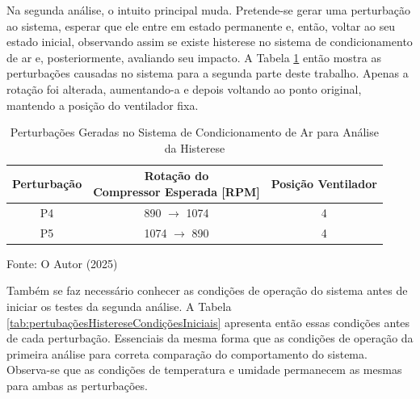 \newpage
Na segunda análise, o intuito principal muda. Pretende-se gerar uma perturbação ao sistema, esperar que ele entre em estado permanente e, então, voltar ao seu estado inicial, observando assim se existe histerese no sistema de condicionamento de ar e, posteriormente, avaliando seu impacto. A Tabela \ref{tab:pertubaçõesHisterese} então mostra as perturbações causadas no sistema para a segunda parte deste trabalho. Apenas a rotação foi alterada, aumentando-a e depois voltando ao ponto original, mantendo a posição do ventilador fixa.
\\
\begin{table}[h]
    \centering
    \begin{tabular}{|c|c|c|}
        \hline
        \textbf{Perturbação} & \makecell{\textbf{Rotação do} \\ \textbf{Compressor Esperada [RPM]}} & \textbf{Posição Ventilador} \\
        \hline
        P4 & 890 $\rightarrow$ 1074 & 4  \\
        P5 & 1074 $\rightarrow$ 890 & 4  \\
        \hline
    \end{tabular}
    \caption{Perturbações Geradas no Sistema de Condicionamento de Ar para Análise da Histerese}
    
    \vspace{5pt} 
    {\footnotesize Fonte: O Autor (2025)}
    \label{tab:pertubaçõesHisterese}
\end{table}

Também se faz necessário conhecer as condições de operação do sistema antes de iniciar os testes da segunda análise. A Tabela \ref{tab:pertubaçõesHistereseCondiçõesIniciais} apresenta então essas condições  antes de cada perturbação. Essenciais da mesma forma que as condições de operação da primeira análise para correta comparação do comportamento do sistema. Observa-se que as condições de temperatura e umidade permanecem as mesmas para ambas as perturbações.

